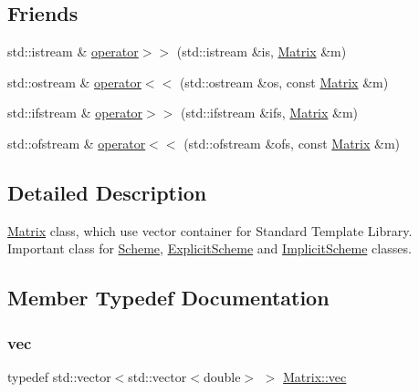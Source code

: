 \subsection*{Friends}
\begin{DoxyCompactItemize}
\item 
std\+::istream \& \mbox{\hyperlink{class_matrix_a3d6c1dcfc038804f4c08687f4f37f48b}{operator$>$$>$}} (std\+::istream \&is, \mbox{\hyperlink{class_matrix}{Matrix}} \&m)
\item 
std\+::ostream \& \mbox{\hyperlink{class_matrix_a060711074cb5bcaf4e75498bc040c4b7}{operator$<$$<$}} (std\+::ostream \&os, const \mbox{\hyperlink{class_matrix}{Matrix}} \&m)
\item 
std\+::ifstream \& \mbox{\hyperlink{class_matrix_aa5699a0bdf0ee014f083ff8a76629d21}{operator$>$$>$}} (std\+::ifstream \&ifs, \mbox{\hyperlink{class_matrix}{Matrix}} \&m)
\item 
std\+::ofstream \& \mbox{\hyperlink{class_matrix_aa574249d63b390cf1108d6e82047ef61}{operator$<$$<$}} (std\+::ofstream \&ofs, const \mbox{\hyperlink{class_matrix}{Matrix}} \&m)
\end{DoxyCompactItemize}


\subsection{Detailed Description}
\mbox{\hyperlink{class_matrix}{Matrix}} class, which use vector container for Standard Template Library. Important class for \mbox{\hyperlink{class_scheme}{Scheme}}, \mbox{\hyperlink{class_explicit_scheme}{Explicit\+Scheme}} and \mbox{\hyperlink{class_implicit_scheme}{Implicit\+Scheme}} classes. 

\subsection{Member Typedef Documentation}
\mbox{\label{class_matrix_a0027109b5516f852be28259267c6c637}} 
\subsubsection{\texorpdfstring{vec}{vec}}
{\footnotesize\ttfamily typedef std\+::vector$<$std\+::vector$<$double$>$ $>$ \mbox{\hyperlink{class_matrix_a0027109b5516f852be28259267c6c637}{Matrix\+::vec}}\hspace{0.3cm}{\ttfamily [private]}}



